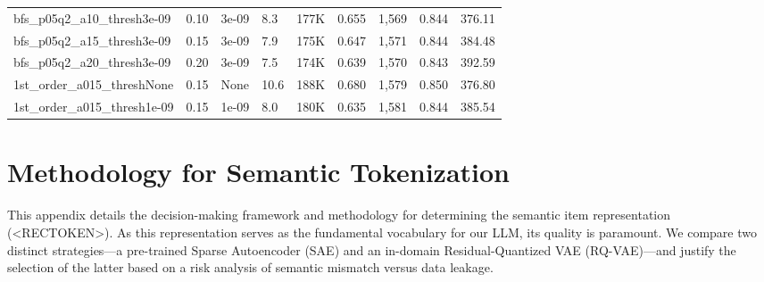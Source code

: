 \documentclass[]{fairmeta}
\begin{document}
\begin{table}[]
\begin{tabular}{lllllllll}
 bfs\_p05q2\_a10\_thresh3e-09  & 0.10           & 3e-09           & 8.3             & 177K             & 0.655           & 1,569             & 0.844                 & 376.11               \\
 bfs\_p05q2\_a15\_thresh3e-09  & 0.15           & 3e-09           & 7.9             & 175K             & 0.647           & 1,571             & 0.844                 & 384.48               \\
 bfs\_p05q2\_a20\_thresh3e-09  & 0.20           & 3e-09           & 7.5             & 174K             & 0.639           & 1,570             & 0.843                 & 392.59               \\
 1st\_order\_a015\_threshNone  & 0.15           & None            & 10.6            & 188K             & 0.680           & 1,579             & 0.850                 & 376.80               \\
 \rowcolor{lightgray}
 1st\_order\_a015\_thresh1e-09 & 0.15           & 1e-09           & 8.0             & 180K             & 0.635           & 1,581             & 0.844                 & 385.54      \\
 \bottomrule
\end{tabular}
\end{table}
\section{Methodology for Semantic Tokenization}\label{app:token}
This appendix details the decision-making framework and methodology for determining the semantic item representation (<RECTOKEN>). As this representation serves as the fundamental vocabulary for our LLM, its quality is paramount. We compare two distinct strategies—a pre-trained Sparse Autoencoder (SAE) and an in-domain Residual-Quantized VAE (RQ-VAE)—and justify the selection of the latter based on a risk analysis of semantic mismatch versus data leakage.
\end{document}
